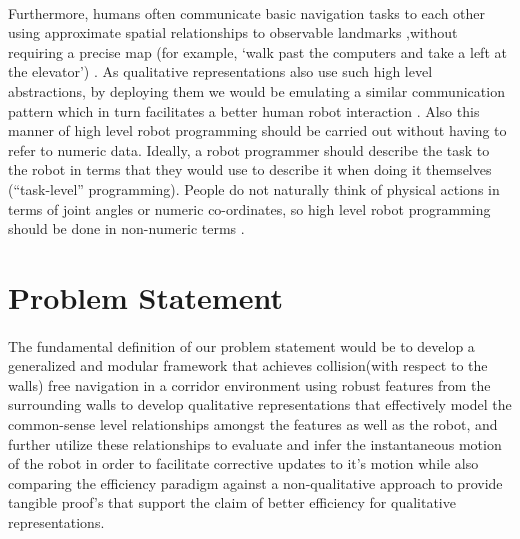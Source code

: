 \paragraph{} Furthermore, humans often communicate basic navigation tasks to each other using approximate spatial relationships to observable landmarks \cite{michon2001and} \cite{chen2015survey} ,without requiring a precise map (for example, `walk past the computers and take a left at the elevator') \cite{shah2013qualitative}. As qualitative representations also use such high level abstractions, by deploying them we would be emulating a similar communication pattern which in turn facilitates a better human robot interaction \cite{dondrup2015computational}. Also this manner of high level robot programming should be carried out without having to refer to numeric data. Ideally, a robot programmer should describe the task to the robot in terms that they would use to describe it when doing it themselves (``task-level'' programming). People do not naturally think of physical actions in terms of joint angles or numeric co-ordinates, so high level robot programming should be done in non-numeric terms \cite{blackwell1988spatial}.


\section{Problem Statement}
\paragraph{} The fundamental definition of our problem statement would be to develop a generalized and modular framework that  achieves collision(with respect to the walls) free navigation in a corridor environment using robust features from the surrounding walls to develop qualitative representations that effectively model the common-sense level relationships amongst the features as well as the robot, and further utilize these relationships to evaluate and infer the instantaneous motion of the robot in order to facilitate corrective updates to it's motion while also comparing the efficiency paradigm against a non-qualitative approach to provide tangible proof's that support the claim of better efficiency for qualitative representations.


